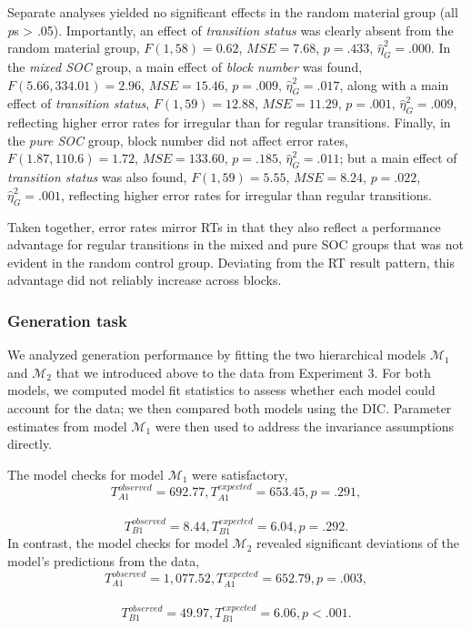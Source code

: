 \documentclass[floatsintext,doc]{apa6}
\theoremstyle{definition}
\theoremstyle{definition}
\theoremstyle{definition}
\theoremstyle{remark}
\begin{document}
Separate analyses yielded no significant effects in the random material
group (all \emph{p}s \textgreater{} .05). Importantly, an effect of
\emph{transition status} was clearly absent from the random material
group, \(F(1, 58) = 0.62\), \(\mathit{MSE} = 7.68\), \(p = .433\),
\(\hat{\eta}^2_G = .000\). In the \emph{mixed SOC} group, a main effect
of \emph{block number} was found, \(F(5.66, 334.01) = 2.96\),
\(\mathit{MSE} = 15.46\), \(p = .009\), \(\hat{\eta}^2_G = .017\), along
with a main effect of \emph{transition status}, \(F(1, 59) = 12.88\),
\(\mathit{MSE} = 11.29\), \(p = .001\), \(\hat{\eta}^2_G = .009\),
reflecting higher error rates for irregular than for regular
transitions. Finally, in the \emph{pure SOC} group, block number did not
affect error rates, \(F(1.87, 110.6) = 1.72\),
\(\mathit{MSE} = 133.60\), \(p = .185\), \(\hat{\eta}^2_G = .011\); but
a main effect of \emph{transition status} was also found,
\(F(1, 59) = 5.55\), \(\mathit{MSE} = 8.24\), \(p = .022\),
\(\hat{\eta}^2_G = .001\), reflecting higher error rates for irregular
than regular transitions.

Taken together, error rates mirror RTs in that they also reflect a
performance advantage for regular transitions in the mixed and pure SOC
groups that was not evident in the random control group. Deviating from
the RT result pattern, this advantage did not reliably increase across
blocks.

\subsubsection{Generation task}\label{generation-task-2}

We analyzed generation performance by fitting the two hierarchical
models \(\mathcal{M}_1\) and \(\mathcal{M}_2\) that we introduced above
to the data from Experiment 3. For both models, we computed model fit
statistics to assess whether each model could account for the data; we
then compared both models using the DIC. Parameter estimates from model
\(\mathcal{M}_1\) were then used to address the invariance assumptions
directly.

The model checks for model \(\mathcal{M}_1\) were satisfactory,
\[T_{A1}^{observed} = 692.77, T_{A1}^{expected} = 653.45, p = .291,\]~
\[T_{B1}^{observed} = 8.44, T_{B1}^{expected} = 6.04, p = .292.\] In
contrast, the model checks for model \(\mathcal{M}_2\) revealed
significant deviations of the model's predictions from the data,
\[T_{A1}^{observed} = 1,077.52, T_{A1}^{expected} = 652.79, p = .003,\]~
\[T_{B1}^{observed} = 49.97, T_{B1}^{expected} = 6.06, p < .001.\]
\end{document}
